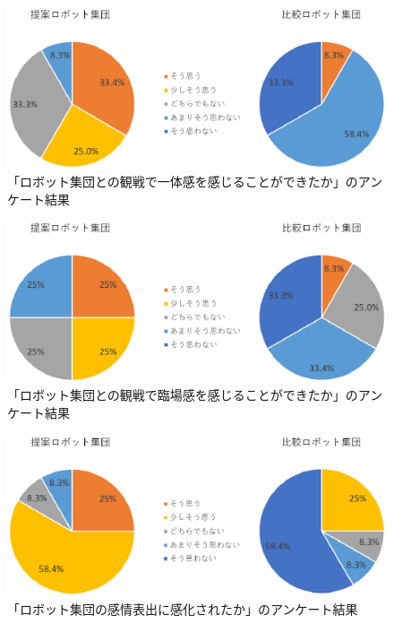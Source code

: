 \newpage

\begin{figure}[!h]
 \begin{center}
\vspace{3cm}
  \centering
  \includegraphics[width=15cm]{images/chapter4/Q3.eps}
  \caption{「ロボット集団との観戦で一体感を感じることができたか」のアンケート結果}
  \label{Q3}
 \end{center}
\end{figure}



\begin{figure}[!h]
 \begin{center}
\vspace{2cm}
  \centering
  \includegraphics[width=15cm]{images/chapter4/Q4.eps}
  \caption{「ロボット集団との観戦で臨場感を感じることができたか」のアンケート結果}
  \label{Q4}
 \end{center}
\end{figure}

\newpage


\begin{figure}[!h]
 \begin{center}
\vspace{3cm}
  \centering
  \includegraphics[width=15cm]{images/chapter4/Q5.eps}
  \caption{「ロボット集団の感情表出に感化されたか」のアンケート結果}
  \label{Q5}
 \end{center}
\end{figure}



